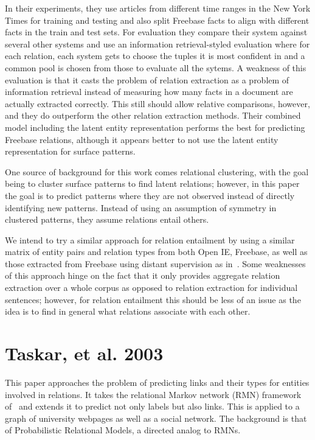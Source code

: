 \documentclass{article}
\begin{document}
In their experiments, they use articles from different time ranges in the New York Times for training and testing and also split Freebase facts to align with different facts in the train and test sets. For evaluation they compare their system against several other systems and use an information retrieval-styled evaluation where for each relation, each system gets to choose the tuples it is most confident in and a common pool is chosen from those to evaluate all the sytems. A weakness of this evaluation is that it casts the problem of relation extraction as a problem of information retrieval instead of measuring how many facts in a document are actually extracted correctly. This still should allow relative comparisons, however, and they do outperform the other relation extraction methods. Their combined model including the latent entity representation performs the best for predicting Freebase relations, although it appears better to not use the latent entity representation for surface patterns.

One source of background for this work comes relational clustering, with the goal being to cluster surface patterns to find latent relations; however, in this paper the goal is to predict patterns where they are not observed instead of directly identifying new patterns. Instead of using an assumption of symmetry in clustered patterns, they assume relations entail others.  

We intend to try a similar approach for relation entailment by using a similar matrix of entity pairs and relation types from both Open IE, Freebase, as well as those extracted from Freebase using distant supervision as in~\cite{HoffmannZLZW11}. Some weaknesses of this approach hinge on the fact that it only provides aggregate relation extraction over a whole corpus as opposed to relation extraction for individual sentences; however, for relation entailment this should be less of an issue as the idea is to find in general what relations associate with each other.

\section*{Taskar, et al. 2003}

This paper approaches the problem of predicting links and their types for entities involved in relations. It takes the relational Markov network (RMN) framework of~\cite{Taskar:2002:DPM:2073876.2073934} and extends it to predict not only labels but also links. This is applied to a graph of university webpages as well as a social network. The background is that of Probabilistic Relational Models, a directed analog to RMNs.
\end{document}
